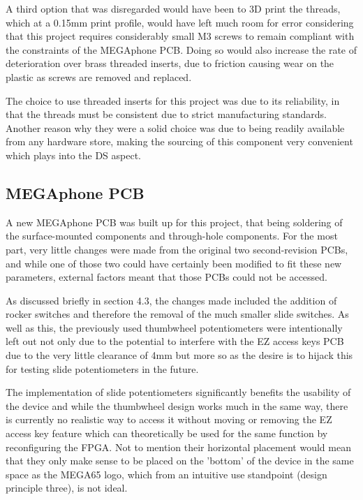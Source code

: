 A third option that was disregarded would have been to 3D print the threads, which at a 0.15mm print profile, would have left much room for error considering that this project requires considerably small M3 screws to remain compliant with the constraints of the MEGAphone PCB.
Doing so would also increase the rate of deterioration over brass threaded inserts, due to friction causing wear on the plastic as screws are removed and replaced.

The choice to use threaded inserts for this project was due to its reliability, in that the threads must be consistent due to strict manufacturing standards.
Another reason why they were a solid choice was due to being readily available from any hardware store, making the sourcing of this component very convenient which plays into the DS aspect.

\subsection{MEGAphone PCB}
A new MEGAphone PCB was built up for this project, that being soldering of the surface-mounted components and through-hole components.
For the most part, very little changes were made from the original two second-revision PCBs, and while one of those two could have certainly been modified to fit these new parameters, external factors meant that those PCBs could not be accessed.

As discussed briefly in section 4.3, the changes made included the addition of rocker switches and therefore the removal of the much smaller slide switches. %
As well as this, the previously used thumbwheel potentiometers were intentionally left out not only due to the potential to interfere with the EZ access keys PCB due to the very little clearance of 4mm but more so as the desire is to hijack this for testing slide potentiometers in the future.

The implementation of slide potentiometers significantly benefits the usability of the device and while the thumbwheel design works much in the same way, there is currently no realistic way to access it without moving or removing the EZ access key feature which can theoretically be used for the same function by reconfiguring the FPGA.
Not to mention their horizontal placement would mean that they only make sense to be placed on the 'bottom' of the device in the same space as the MEGA65 logo, which from an intuitive use standpoint (design principle three), is not ideal.

